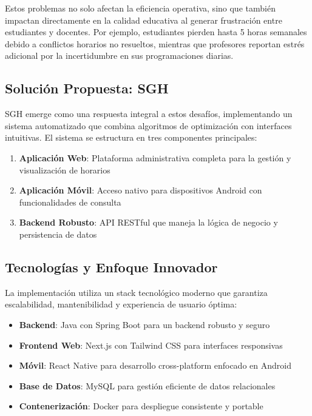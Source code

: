 Estos problemas no solo afectan la eficiencia operativa, sino que también impactan directamente en la calidad educativa al generar frustración entre estudiantes y docentes. Por ejemplo, estudiantes pierden hasta 5 horas semanales debido a conflictos horarios no resueltos, mientras que profesores reportan estrés adicional por la incertidumbre en sus programaciones diarias.

\subsection{Solución Propuesta: SGH}

SGH emerge como una respuesta integral a estos desafíos, implementando un sistema automatizado que combina algoritmos de optimización con interfaces intuitivas. El sistema se estructura en tres componentes principales:

\begin{enumerate}
\item \textbf{Aplicación Web}: Plataforma administrativa completa para la gestión y visualización de horarios
\item \textbf{Aplicación Móvil}: Acceso nativo para dispositivos Android con funcionalidades de consulta
\item \textbf{Backend Robusto}: API RESTful que maneja la lógica de negocio y persistencia de datos
\end{enumerate}

\subsection{Tecnologías y Enfoque Innovador}

La implementación utiliza un stack tecnológico moderno que garantiza escalabilidad, mantenibilidad y experiencia de usuario óptima:

\begin{itemize}
\item \textbf{Backend}: Java con Spring Boot para un backend robusto y seguro
\item \textbf{Frontend Web}: Next.js con Tailwind CSS para interfaces responsivas
\item \textbf{Móvil}: React Native para desarrollo cross-platform enfocado en Android
\item \textbf{Base de Datos}: MySQL para gestión eficiente de datos relacionales
\item \textbf{Contenerización}: Docker para despliegue consistente y portable
\end{itemize}

